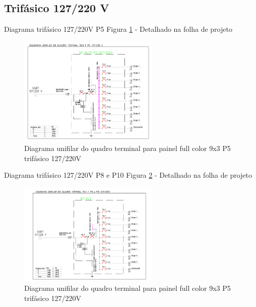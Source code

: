\subsection{Trifásico 127/220 V}
Diagrama trifásico 127/220V P5 Figura \ref{fig:unifilar9x3220p5} - Detalhado na folha de projeto 

\begin{figure}[h]
    \centering
    \includegraphics[width=0.6\textwidth]{image/DU9X3T220P5.png}
    \caption{Diagrama unifilar do quadro terminal para painel full color 9x3 P5 trifásico 127/220V}
   \label{fig:unifilar9x3220p5}
\end{figure}
Diagrama trifásico 127/220V P8 e P10 Figura \ref{fig:unifilar9x3220p8p10} - Detalhado na folha de projeto
\begin{figure}[h]
    \centering
    \includegraphics[width=0.6\textwidth]{image/DU9X3T220P8P10.png}
    \caption{Diagrama unifilar do quadro terminal para painel full color 9x3 P5 trifásico 127/220V}
   \label{fig:unifilar9x3220p8p10}
\end{figure}

